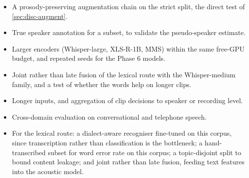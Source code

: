 \begin{itemize}
  \item A prosody-preserving augmentation chain on the strict split, the direct
        test of \cref{sec:disc-augment}.
  \item True speaker annotation for a subset, to validate the pseudo-speaker
        estimate.
  \item Larger encoders (Whisper-large, XLS-R-1B, MMS) within the same
        free-GPU budget, and repeated seeds for the Phase 6 models.
  \item Joint rather than late fusion of the lexical route with the
        Whisper-medium family, and a test of whether the words help on longer
        clips.
  \item Longer inputs, and aggregation of clip decisions to speaker or
        recording level.
  \item Cross-domain evaluation on conversational and telephone speech.
  \item For the lexical route: a dialect-aware recogniser fine-tuned on this
        corpus, since transcription rather than classification is the
        bottleneck; a hand-transcribed subset for word error rate on this
        corpus; a topic-disjoint split to bound content leakage; and joint
        rather than late fusion, feeding text features into the acoustic model.
\end{itemize}
